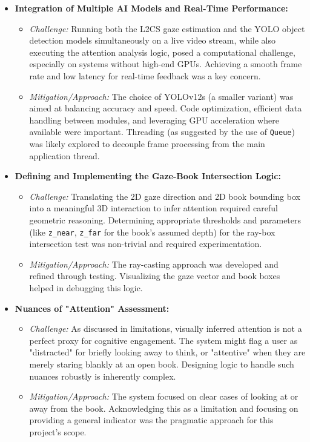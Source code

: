 \begin{itemize}
    \item \textbf{Integration of Multiple AI Models and Real-Time Performance:}
    \begin{itemize}
        \item \textit{Challenge:} Running both the L2CS gaze estimation and the YOLO object detection models simultaneously on a live video stream, while also executing the attention analysis logic, posed a computational challenge, especially on systems without high-end GPUs. Achieving a smooth frame rate and low latency for real-time feedback was a key concern.
        \item \textit{Mitigation/Approach:} The choice of YOLOv12s (a smaller variant) was aimed at balancing accuracy and speed. Code optimization, efficient data handling between modules, and leveraging GPU acceleration where available were important. Threading (as suggested by the use of \texttt{Queue}) was likely explored to decouple frame processing from the main application thread.
    \end{itemize}

    \item \textbf{Defining and Implementing the Gaze-Book Intersection Logic:}
    \begin{itemize}
        \item \textit{Challenge:} Translating the 2D gaze direction and 2D book bounding box into a meaningful 3D interaction to infer attention required careful geometric reasoning. Determining appropriate thresholds and parameters (like \texttt{z\_near}, \texttt{z\_far} for the book's assumed depth) for the ray-box intersection test was non-trivial and required experimentation.
        \item \textit{Mitigation/Approach:} The ray-casting approach was developed and refined through testing. Visualizing the gaze vector and book boxes helped in debugging this logic.
    \end{itemize}

    \item \textbf{Nuances of "Attention" Assessment:}
    \begin{itemize}
        \item \textit{Challenge:} As discussed in limitations, visually inferred attention is not a perfect proxy for cognitive engagement. The system might flag a user as "distracted" for briefly looking away to think, or "attentive" when they are merely staring blankly at an open book. Designing logic to handle such nuances robustly is inherently complex.
        \item \textit{Mitigation/Approach:} The system focused on clear cases of looking at or away from the book. Acknowledging this as a limitation and focusing on providing a general indicator was the pragmatic approach for this project's scope.
    \end{itemize}


\end{itemize}
